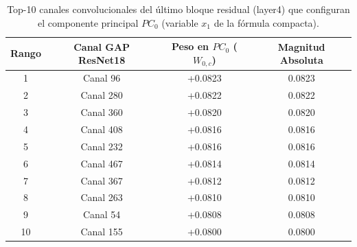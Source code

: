 \begin{table}[htbp]
\centering
\small
\begin{tabular}{cccc}
\hline
\textbf{Rango} & \textbf{Canal GAP ResNet18} & \textbf{Peso en $PC_0$ ($W_{0,c}$)} & \textbf{Magnitud Absoluta} \\
\hline
1 & Canal 96 & +0.0823 & 0.0823 \\
2 & Canal 280 & +0.0822 & 0.0822 \\
3 & Canal 360 & +0.0820 & 0.0820 \\
4 & Canal 408 & +0.0816 & 0.0816 \\
5 & Canal 232 & +0.0816 & 0.0816 \\
6 & Canal 467 & +0.0814 & 0.0814 \\
7 & Canal 367 & +0.0812 & 0.0812 \\
8 & Canal 263 & +0.0810 & 0.0810 \\
9 & Canal 54 & +0.0808 & 0.0808 \\
10 & Canal 155 & +0.0800 & 0.0800 \\
\hline
\end{tabular}
\caption{Top-10 canales convolucionales del último bloque residual (layer4) que configuran el componente principal $PC_0$ (variable $x_1$ de la fórmula compacta).}
\label{tab:frente2_top_channels}
\end{table}
